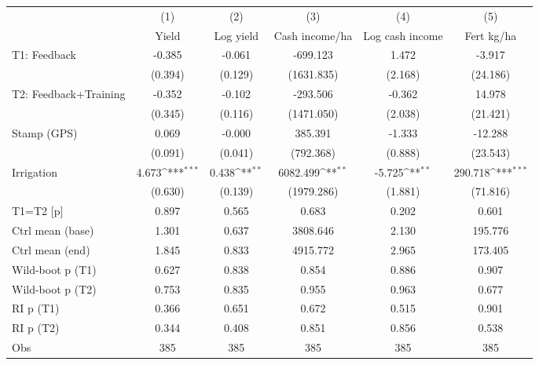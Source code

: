 {
\def\sym#1{\ifmmode^{#1}\else\(^{#1}\)\fi}
\begin{tabular}{l*{5}{c}}
\toprule
                    &\multicolumn{1}{c}{(1)}&\multicolumn{1}{c}{(2)}&\multicolumn{1}{c}{(3)}&\multicolumn{1}{c}{(4)}&\multicolumn{1}{c}{(5)}\\
                    &\multicolumn{1}{c}{Yield}&\multicolumn{1}{c}{Log yield}&\multicolumn{1}{c}{Cash income/ha}&\multicolumn{1}{c}{Log cash income}&\multicolumn{1}{c}{Fert kg/ha}\\
\midrule
T1: Feedback        &      -0.385         &      -0.061         &    -699.123         &       1.472         &      -3.917         \\
                    &     (0.394)         &     (0.129)         &  (1631.835)         &     (2.168)         &    (24.186)         \\
T2: Feedback+Training&      -0.352         &      -0.102         &    -293.506         &      -0.362         &      14.978         \\
                    &     (0.345)         &     (0.116)         &  (1471.050)         &     (2.038)         &    (21.421)         \\
Stamp (GPS)         &       0.069         &      -0.000         &     385.391         &      -1.333         &     -12.288         \\
                    &     (0.091)         &     (0.041)         &   (792.368)         &     (0.888)         &    (23.543)         \\
Irrigation          &       4.673\sym{***}&       0.438\sym{**} &    6082.499\sym{**} &      -5.725\sym{**} &     290.718\sym{***}\\
                    &     (0.630)         &     (0.139)         &  (1979.286)         &     (1.881)         &    (71.816)         \\
\midrule
T1=T2 [p]           &       0.897         &       0.565         &       0.683         &       0.202         &       0.601         \\
Ctrl mean (base)    &       1.301         &       0.637         &    3808.646         &       2.130         &     195.776         \\
Ctrl mean (end)     &       1.845         &       0.833         &    4915.772         &       2.965         &     173.405         \\
Wild-boot p (T1)    &       0.627         &       0.838         &       0.854         &       0.886         &       0.907         \\
Wild-boot p (T2)    &       0.753         &       0.835         &       0.955         &       0.963         &       0.677         \\
RI p (T1)           &       0.366         &       0.651         &       0.672         &       0.515         &       0.901         \\
RI p (T2)           &       0.344         &       0.408         &       0.851         &       0.856         &       0.538         \\
Obs                 &         385         &         385         &         385         &         385         &         385         \\
\bottomrule
\end{tabular}
}
